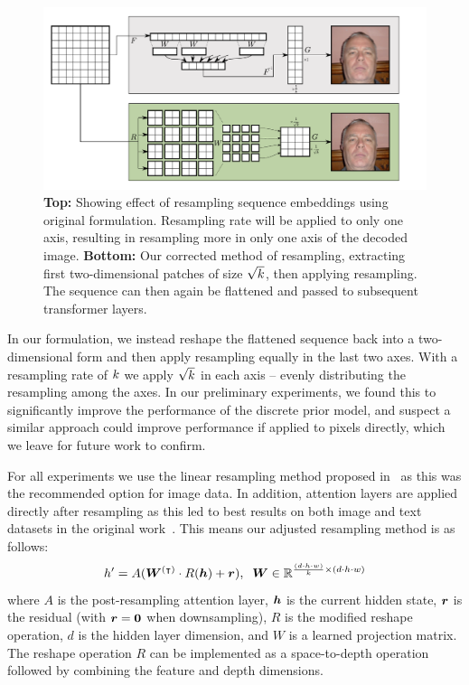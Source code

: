 \begin{figure}[ht!]
    \label{fig:resample}
    \centering
    \includegraphics[width=\textwidth]{figures/resample.pdf}
    \caption{
        \textbf{Top:} Showing effect of resampling sequence embeddings using
        original formulation. Resampling rate will be applied to only one axis,
        resulting in resampling more in only one axis of the decoded image.
        \textbf{Bottom:} Our corrected method of resampling, extracting first
        two-dimensional patches of size $\sqrt{k}$, then applying
        resampling. The sequence can then again be flattened and passed to
        subsequent transformer layers.
    }
\end{figure}

In our formulation, we instead reshape the flattened sequence back into a
two-dimensional form and then apply resampling equally in the last two axes.
With a resampling rate of $k$ we apply $\sqrt{k}$ in
each axis -- evenly distributing the resampling among the axes. In our
preliminary experiments, we found this to significantly improve the performance
of the discrete prior model, and suspect a similar approach could improve
performance if applied to pixels directly, which we leave for future work to
confirm.

For all experiments we use the linear resampling method proposed
in~\cite{nawrot2021hierarchical} as this was the recommended option for image
data. In addition, attention layers are applied directly after resampling as
this led to best results on both image and text datasets in the original
work~\cite{nawrot2021hierarchical}. This means our adjusted resampling method is
as follows:
\begin{equation}
    h' = A({\bm{W}}^{(\intercal)} \cdot R({\bm{h}}) + {\bm{r}}), \;\; {\bm{W}} \in
    \mathbb{R}^{\frac{(d \cdot h \cdot w)}{k} \times (d \cdot h \cdot w)}
\end{equation}
where $A$ is the post-resampling attention layer, ${\bm{h}}$ is the current hidden
state, ${\bm{r}}$ is the residual (with ${\bm{r}} = \bm{0}$ when downsampling), $R$ is the
modified reshape operation, $d$ is the hidden layer dimension, and $W$ is a
learned projection matrix. The reshape operation $R$ can be implemented as a
space-to-depth operation followed by combining the feature and depth dimensions.

